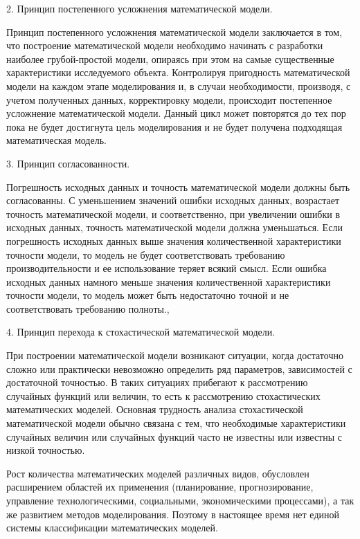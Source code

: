 2. Принцип постепенного усложнения математической модели.


Принцип постепенного усложнения математической модели заключается в том, что  построение математической модели необходимо начинать с разработки наиболее грубой-простой модели, опираясь при этом на самые существенные характеристики исследуемого объекта. Контролируя пригодность математической модели на каждом этапе моделирования и, в случаи необходимости, производя, с учетом полученных данных, корректировку модели, происходит постепенное усложнение математической модели. Данный цикл может повторятся до тех пор пока не будет достигнута цель моделирования и не будет получена подходящая математическая модель.


3. Принцип согласованности.


Погрешность исходных данных и точность математической модели должны быть согласованны. С уменьшением значений ошибки исходных данных, возрастает точность математической модели, и соответственно, при увеличении ошибки в исходных данных, точность математической модели должна уменьшаться. Если погрешность исходных данных выше значения количественной характеристики точности модели, то модель не будет соответствовать требованию производительности и ее использование теряет всякий смысл. Если ошибка исходных данных намного меньше значения количественной характеристики точности модели, то модель может быть недостаточно точной и не соответствовать требованию полноты.\cite{b1}, \cite{b3}


4. Принцип перехода к стохастической математической модели.


При построении математической модели возникают ситуации, когда достаточно сложно или практически невозможно определить ряд параметров, зависимостей с достаточной точностью. В таких ситуациях прибегают к рассмотрению случайных функций или величин, то есть к рассмотрению стохастических математических моделей. Основная трудность анализа стохастической математической модели обычно связана с тем, что необходимые характеристики случайных величин или случайных функций часто не известны или известны с низкой точностью.


Рост количества математических моделей различных видов, обусловлен расширением областей их применения (планирование, прогнозирование, управление технологическими, социальными, экономическими процессами), а так же развитием методов моделирования. Поэтому в настоящее время нет единой системы классификации математических моделей.


